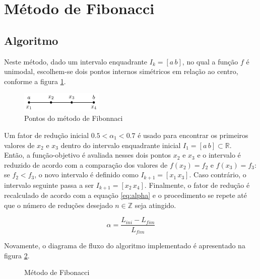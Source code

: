 \documentclass[a4paper,12pt,utf8x,notitlepage]{article}
\begin{document}
\section{Método de Fibonacci}

\vspace{0.5cm}

\subsection{Algoritmo}

Neste método, dado um intervalo enquadrante $I_k = [a \,  b]$, no qual a função $f$ é unimodal, escolhem-se dois pontos internos simétricos em relação ao centro, conforme a figura \ref{fig:fib}.

\begin{figure}[!h]
\centering
    \includegraphics[width=0.35\textwidth]{fibonacci.pdf}
    \caption{Pontos do método de Fibonnaci}
   \label{fig:fib}
\end{figure}

Um fator de redução inicial $0.5<\alpha_1<0.7$ é usado para encontrar os primeiros valores de $x_2$ e $x_3$ dentro do intervalo enquadrante inicial $I_1 = [a \, b] \subset \mathbb{R}$. \\

Então, a função-objetivo é avaliada nesses dois pontos $x_2$ e $x_3$ e o intervalo é reduzido de acordo com a comparação dos valores de $f(x_2)= f_2$ e $f(x_3)=f_3$: se $f_2<f_3$, o novo intervalo é definido como $I_{k+1}=[x_1 \,x_3]$. Caso contrário, o intervalo seguinte passa a ser $I_{k+1}=[x_2 \,x_4]$. Finalmente, o fator de redução é recalculado de acordo com a equação \ref{eq:alpha} e o procedimento se repete até que o número de reduções desejado $n \in \mathbb{Z}$ seja atingido.

\begin{equation}
\alpha = \frac{L_{ini}-L_{fim}}{L_{fim}}
\label{eq:alpha}
\end{equation}

Novamente, o diagrama de fluxo do algoritmo implementado é apresentado na figura \ref{fig:fibonacci}.

\begin{figure}[h!]
\centering
\scalebox{0.85}{}
\caption{Método de Fibonacci}
\label{fig:fibonacci}
\end{figure}
\end{document}
